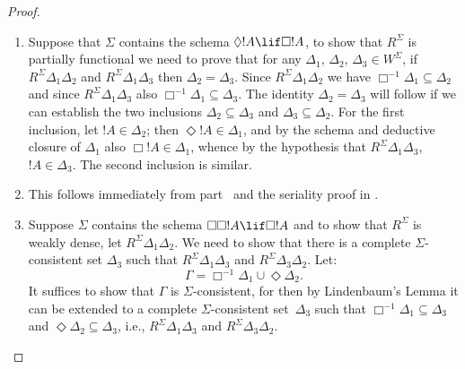 \documentclass[../../../include/open-logic-section]{subfiles}
\begin{document}
\begin{proof}
  \begin{enumerate}
  \item Suppose that $\Sigma$ contains the schema $\Diamond !A \lif
    \Box !A$, to show that $R^\Sigma$ is partially functional we need
    to prove that for any $\Delta_1$, $\Delta_2$, $\Delta_3 \in
    W^\Sigma$, if $R^\Sigma \Delta_1\Delta_2$ and $R^\Sigma
    \Delta_1\Delta_3$ then $\Delta_2=\Delta_3$. Since $R^\Sigma
    \Delta_1\Delta_2$ we have $\Box^{-1}\Delta_1 \subseteq \Delta_2$
    and since $R^\Sigma \Delta_1\Delta_3$ also $\Box^{-1}\Delta_1
    \subseteq \Delta_3$. The identity
    $\Delta_2=\Delta_3$ will follow if we can establish the two
    inclusions $\Delta_2 \subseteq \Delta_3$ and $\Delta_3 \subseteq
    \Delta_2$. For the first inclusion, let $!A \in \Delta_2$; then
    $\Diamond!A \in \Delta_1$, and by the schema and deductive closure
    of $\Delta_1$ also $\Box!A \in \Delta_1$, whence by the hypothesis
    that $R^\Sigma \Delta_1\Delta_3$, $!A \in \Delta_3$. The second
    inclusion is similar.

  \item This follows immediately from part~
    and the seriality proof in .

  \item Suppose $\Sigma$ contains the schema $\Box\Box!A \lif \Box!A$
    and to show that $R^\Sigma$ is weakly dense, let $R^\Sigma
    \Delta_1\Delta_2$. We need to show that there is a complete
    $\Sigma$-consistent set $\Delta_3$ such that $R^\Sigma
    \Delta_1\Delta_3$ and $R^\Sigma \Delta_3\Delta_2$. Let:
    \[
    \Gamma = \Box^{-1}\Delta_1 \cup \Diamond\Delta_2.
    \]
    It suffices to show that $\Gamma$ is $\Sigma$-consistent, for then
    by Lindenbaum's Lemma it can be extended to a complete
    $\Sigma$-consistent set~$\Delta_3$ such that $\Box^{-1}\Delta_1
    \subseteq \Delta_3$ and $\Diamond\Delta_2 \subseteq \Delta_3$,
    i.e., $R^\Sigma \Delta_1\Delta_3$ and $R^\Sigma
    \Delta_3\Delta_2$.


\end{enumerate}
\end{proof}
\end{document}
